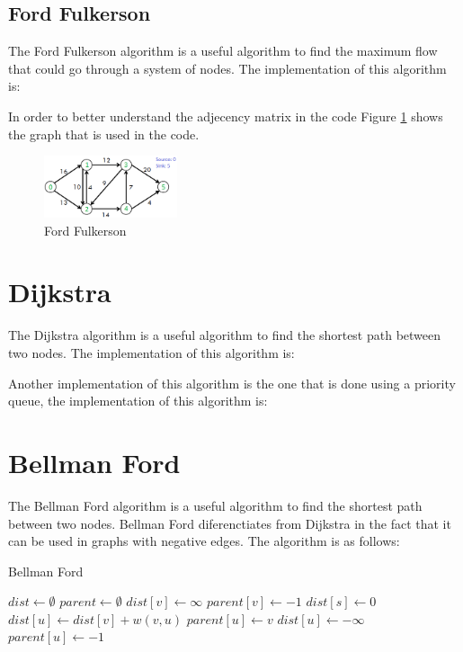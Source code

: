 \subsection{Ford Fulkerson}

The Ford Fulkerson algorithm is a useful algorithm to find the maximum flow that could go through a system of nodes. The implementation of this algorithm is:



In order to better understand the adjecency matrix in the code Figure \ref{fig:ford_fulkerson} shows the graph that is used in the code.

\begin{figure}[h]
\centering
\includegraphics[width=0.35\textwidth]{../Figures/ford_fulkerson11.png}
\caption{Ford Fulkerson}
\label{fig:ford_fulkerson}
\end{figure}

\section{Dijkstra}

The Dijkstra algorithm is a useful algorithm to find the shortest path between two nodes. The implementation of this algorithm is:



Another implementation of this algorithm is the one that is done using a priority queue, the implementation of this algorithm is:



\section{Bellman Ford}

The Bellman Ford algorithm is a useful algorithm to find the shortest path between two nodes. Bellman Ford diferenctiates from Dijkstra in the fact that it can be used in graphs with negative edges. The algorithm is as follows:

\begin{algorithm}
\caption{Bellman Ford}
\label{alg:bellman_ford}
\begin{algorithmic}[1]
\State $dist \gets \emptyset$
\State $parent \gets \emptyset$
\State $dist[v] \gets \infty$
\State $parent[v] \gets -1$
\EndFor
\State $dist[s] \gets 0$
\State $dist[u] \gets dist[v] + w(v, u)$
\State $parent[u] \gets v$
\EndIf
\EndFor
\EndFor
\EndFor
{}
\State $dist[u] \gets -\infty$
\State $parent[u] \gets -1$
\EndIf
\EndFor
\EndFor
\EndProcedure
\end{algorithmic}
\end{algorithm}

